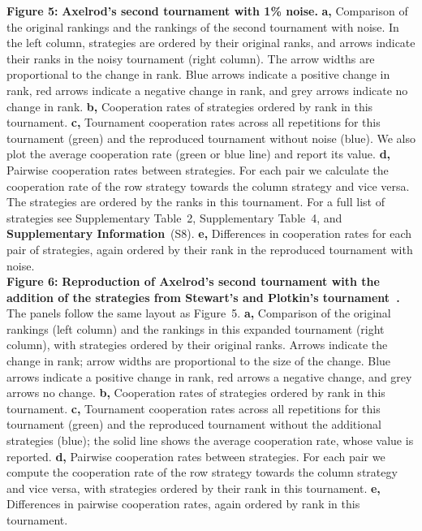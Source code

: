 \documentclass{article}
\newcommand{\SI}{\textbf{Supplementary Information}}
\begin{document}
\noindent
\textbf{Figure 5:} \textbf{Axelrod's second tournament with 1\% noise.}
\textbf{a,} Comparison of the original rankings and the rankings of the second
tournament with noise. In the left column, strategies are ordered by their
original ranks, and arrows indicate their ranks in the noisy tournament (right
column). The arrow widths are proportional to the change in rank. Blue arrows
indicate a positive change in rank, red arrows indicate a negative change in
rank, and grey arrows indicate no change in rank.
\textbf{b,} Cooperation rates of strategies ordered by rank in this tournament.
\textbf{c,} Tournament cooperation rates across all repetitions for
this tournament (green) and the reproduced tournament without noise (blue).
We also plot the average cooperation rate (green or blue line) and report its value.
\textbf{d,} Pairwise cooperation rates between strategies. For each
pair we calculate the cooperation rate of the row strategy towards the column
strategy and vice versa. The strategies are ordered by the ranks in this
tournament. For a full list of strategies see Supplementary Table~2,
Supplementary Table~4, and \SI~(S8).
\textbf{e,} Differences in cooperation rates for each pair of strategies, again 
ordered by their rank in the reproduced tournament with noise.\\

\noindent
\textbf{Figure 6:} \textbf{Reproduction of Axelrod's second tournament with the addition
of the strategies from Stewart's and Plotkin's tournament~\cite{Stewart2012}.}
The panels follow the same layout as Figure~5.
\textbf{a,} Comparison of the original rankings (left column) and the rankings
in this expanded tournament (right column), with strategies ordered by their
original ranks. Arrows indicate the change in rank; arrow widths are
proportional to the size of the change. Blue arrows indicate a positive change
in rank, red arrows a negative change, and grey arrows no change.
\textbf{b,} Cooperation rates of strategies ordered by rank in this tournament.
\textbf{c,} Tournament cooperation rates across all repetitions for this
tournament (green) and the reproduced tournament without the additional
strategies (blue); the solid line shows the average cooperation rate, whose
value is reported.
\textbf{d,} Pairwise cooperation rates between strategies. For each pair we
compute the cooperation rate of the row strategy towards the column strategy
and vice versa, with strategies ordered by their rank in this tournament.
\textbf{e,} Differences in pairwise cooperation rates, again ordered by rank
in this tournament.\\
\end{document}

